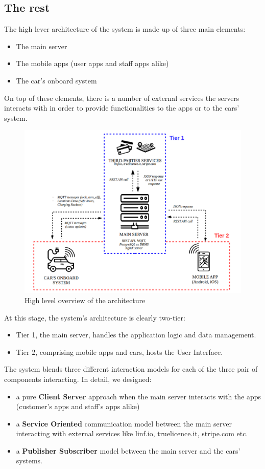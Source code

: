 \documentclass[11pt]{article} %
\begin{document}
\subsection{The rest}

The high lever architecture of the system is made up of three main elements:
\begin{itemize}[noitemsep]
	\item The main server
	\item The mobile apps (user apps and staff apps alike)
	\item The car's onboard system
\end{itemize}
On top of these elements, there is a number of external services the servers interacts with in order to provide functionalities to the apps or to the cars' system.

\begin{figure}[H]
	\centering
	\includegraphics[width=1\textwidth]{proposed_system2.png}
	\caption{High level overview of the architecture}
\end{figure}	

At this stage, the system's architecture is clearly two-tier:
\begin{itemize}[noitemsep]
	\item Tier 1, the main server, handles the application logic and data management.
	\item Tier 2, comprising mobile apps and cars, hosts the User Interface.
\end{itemize}

The system blends three different interaction models for each of the three pair of components interacting. In detail, we designed:
\begin{itemize}
	\item a pure \textbf{Client Server} approach when the main server interacts with the apps (customer's apps and staff's apps alike)
	\item a \textbf{Service Oriented} communication model between the main server interacting with external services like linf.io, truelicence.it, stripe.com etc.
	\item a \textbf{Publisher Subscriber} model between the main server and the cars' systems.
\end{itemize}
\end{document}
